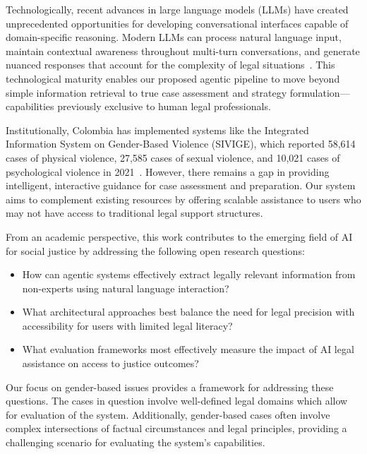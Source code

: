 Technologically, recent advances in large language models (LLMs) 
have created unprecedented opportunities for developing conversational 
interfaces capable of domain-specific reasoning. Modern LLMs can 
process natural language input, maintain contextual awareness 
throughout multi-turn conversations, and generate nuanced 
responses that account for the complexity of legal 
situations~\cite{darrow2023}. This technological maturity 
enables our proposed agentic pipeline to move beyond simple 
information retrieval to true case assessment and strategy 
formulation—capabilities previously exclusive to human legal 
professionals.

Institutionally, Colombia has implemented systems like the 
Integrated Information System on Gender-Based Violence (SIVIGE), 
which reported 58,614 cases of physical violence, 27,585 cases of 
sexual violence, and 10,021 cases of psychological violence in 
2021~\cite{advocates2023}. However, there remains a gap in 
providing intelligent, interactive guidance for case assessment 
and preparation. Our system aims to complement existing resources 
by offering scalable assistance to users who may not have access 
to traditional legal support structures.

From an academic perspective, this work contributes to the 
emerging field of AI for social justice by addressing the following 
open research questions:

\begin{itemize}
\item How can agentic systems effectively extract legally relevant information from non-experts using natural language interaction?
\item What architectural approaches best balance the need for legal precision with accessibility for users with limited legal literacy?
\item What evaluation frameworks most effectively measure the impact of AI legal assistance on access to justice outcomes?
\end{itemize}

Our focus on gender-based issues provides a framework for addressing these questions. The cases in question involve well-defined legal domains which allow for evaluation of the system. 
Additionally, gender-based cases 
often involve complex intersections of factual circumstances 
and legal principles, providing a 
challenging scenario for evaluating 
the system’s capabilities.

